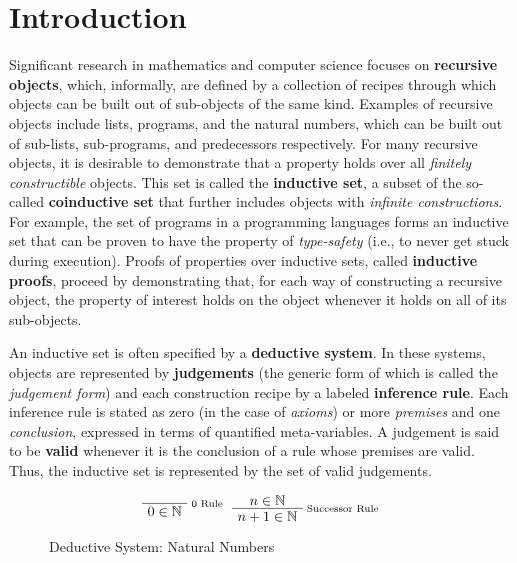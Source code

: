 \documentclass[titlepage]{article}
\newenvironment{bprooftree}
  {\leavevmode\hbox\bgroup}
  {\DisplayProof\egroup}
\begin{document}


\section{Introduction}

Significant research in mathematics and computer science focuses on \textbf{recursive objects}, which, informally, are defined by a collection of recipes through which objects can be built out of sub-objects of the same kind. Examples of recursive objects include lists, programs, and the natural numbers, which can be built out of sub-lists, sub-programs, and predecessors respectively. For many recursive objects, it is desirable to demonstrate that a property holds over all \textit{finitely constructible} objects. This set is called the \textbf{inductive set}, a subset of the so-called \textbf{coinductive set} that further includes objects with \textit{infinite constructions}. For example, the set of programs in a programming languages forms an inductive set that can be proven to have the property of \textit{type-safety} (i.e., to never get stuck during execution). Proofs of properties over inductive sets, called \textbf{inductive proofs}, proceed by demonstrating that, for each way of constructing a recursive object, the property of interest holds on the object whenever it holds on all of its sub-objects.

An inductive set is often specified by a \textbf{deductive system}. In these systems, objects are represented by \textbf{judgements} (the generic form of which is called the \textit{judgement form}) and each construction recipe by a labeled \textbf{inference rule}. Each inference rule is stated as zero (in the case of \textit{axioms}) or more \textit{premises} and one \textit{conclusion}, expressed in terms of quantified meta-variables. A judgement is said to be \textbf{valid} whenever it is the conclusion of a rule whose premises are valid. Thus, the inductive set is represented by the set of valid judgements.

\begin{figure}[h]
\caption{Deductive System: Natural Numbers}
\label{fig:nat-ded}

\begin{center}
\end{center}

\[
\begin{bprooftree}
\AxiomC{}
\RightLabel{\scriptsize 0 Rule}
\UnaryInfC{$0 \in \mathbb{N}$}
\end{bprooftree}
\begin{bprooftree}
\AxiomC{$n \in \mathbb{N}$}
\RightLabel{\scriptsize Successor Rule}
\UnaryInfC{$n+1 \in \mathbb{N}$}
\end{bprooftree}
\]
\end{figure}
\end{document}
